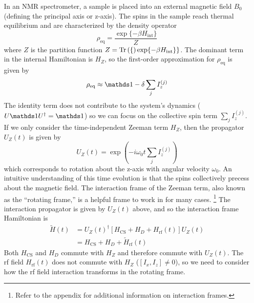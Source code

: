 In an NMR spectrometer, a sample is placed into an external magnetic field $B_0$ (defining the principal axis or z-axis).
The spins in the sample reach thermal equilibrium and are characterized by the density operator
\begin{equation}\label{eq:thermal-density-operator}
    \rho_{\text{eq}} = \frac{
        \exp\{-\beta H_{\text{int}}\}
        }{Z}
\end{equation}
where $Z$ is the partition function $Z=\text{Tr}\left( \{ \right)\exp\{-\beta H_{\text{int}}\}\}$.
The dominant term in the internal Hamiltonian is $H_Z$, so the first-order approximation for $\rho_{\text{eq}}$ is given by
\[
\rho_{\text{eq}} \approx \identity - \delta \sum_j I_z^{(j)}
\]
The identity term does not contribute to the system's dynamics ($U \identity U^\dagger = \identity$) so we can focus on the collective spin term $\sum_j I_z^{(j)}$.
If we only consider the time-independent Zeeman term $H_Z$, then the propagator $U_Z(t)$ is given by
\[
U_Z(t) = \exp \left( -i \omega_0 t \sum_j I_z^{(j)} \right)
\]
which corresponds to rotation about the z-axis with angular velocity $\omega_0$. An intuitive understanding of this time evolution is that the spins collectively precess about the magnetic field. The interaction frame of the Zeeman term, also known as the ``rotating frame,'' is a helpful frame to work in for many cases.%
\footnote{
Refer to the appendix for additional information on interaction frames.
}
The interaction propagator
is given by $U_Z(t)$ above, and so the interaction frame Hamiltonian is
\begin{align*}
    \widetilde{H}(t) &= {U_Z(t)}^{\dagger} \left[ H_\text{CS} + H_D + H_\text{rf}(t) \right] U_Z(t) \\
        &= H_\text{CS} + H_D + \widetilde{H}_\text{rf}(t)
\end{align*}
Both $H_\text{CS}$ and $H_D$ commute with $H_Z$ and therefore commute with $U_Z(t)$. The rf field $H_\text{rf}(t)$ does not commute with $H_Z$ ($[I_x, I_z] \ne 0$), so we need to consider how the rf field interaction transforms in the rotating frame.

